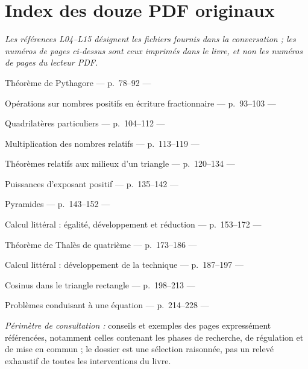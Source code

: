 \documentclass[11pt,a4paper]{article}
\begin{document}
\section{Index des douze PDF originaux}
\textit{Les références L04--L15 désignent les fichiers fournis dans la conversation ; les numéros de pages ci-dessus sont ceux imprimés dans le livre, et non les numéros de pages du lecteur PDF.}
\begin{description}[leftmargin=13mm,style=nextline]
\raggedright\footnotesize\sloppy
\item[L04] Théorème de Pythagore --- p.~78--92 --- 
\item[L05] Opérations sur nombres positifs en écriture fractionnaire --- p.~93--103 --- 
\item[L06] Quadrilatères particuliers --- p.~104--112 --- 
\item[L07] Multiplication des nombres relatifs --- p.~113--119 --- 
\item[L08] Théorèmes relatifs aux milieux d'un triangle --- p.~120--134 --- 
\item[L09] Puissances d'exposant positif --- p.~135--142 --- 
\item[L10] Pyramides --- p.~143--152 --- 
\item[L11] Calcul littéral : égalité, développement et réduction --- p.~153--172 --- 
\item[L12] Théorème de Thalès de quatrième --- p.~173--186 --- 
\item[L13] Calcul littéral : développement de la technique --- p.~187--197 --- 
\item[L14] Cosinus dans le triangle rectangle --- p.~198--213 --- 
\item[L15] Problèmes conduisant à une équation --- p.~214--228 --- 
\end{description}
\normalsize
\vspace{0.5em}
\textit{Périmètre de consultation :} conseils et exemples des pages expressément référencées, notamment celles contenant les phases de recherche, de régulation et de mise en commun ; le dossier est une sélection raisonnée, pas un relevé exhaustif de toutes les interventions du livre.
\end{document}
